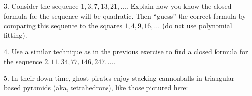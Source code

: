 \documentclass[10pt,]{book}
\theoremstyle{plain}
\theoremstyle{definition}
\numberwithin{equation}{chapter}
\newlength{\panelmax}
\begin{document}
\begin{exerciselist}
\par\smallskip
\item[3.]\hypertarget{exercise-164}{}
          Consider the sequence \(1, 3, 7, 13, 21, \ldots\). Explain how you know the closed formula for the sequence will be quadratic. Then ``guess'' the correct formula by comparing this sequence to the squares \(1, 4, 9, 16, \ldots\) (do not use polynomial fitting).
\par\smallskip
\item[4.]\hypertarget{exercise-165}{}
          Use a similar technique as in the previous exercise to find a closed formula for the sequence \(2, 11, 34, 77, 146, 247,\ldots\).
\par\smallskip
\item[5.]\hypertarget{exercise-166}{}
          In their down time, ghost pirates enjoy stacking cannonballs in triangular based pyramids (aka, tetrahedrons), like those pictured here:
{%
\setlength{\panelmax}{0pt}
\newsavebox{\panelboxNimage}
\newlength{\phNimage}\setlength{\phNimage}{\ht\panelboxNimage+\dp\panelboxNimage}
\settototalheight{\phNimage}{\usebox{\panelboxNimage}}
\setlength{\panelmax}{\maxof{\panelmax}{\phNimage}}
\newsavebox{\panelboxOimage}
\newlength{\phOimage}\setlength{\phOimage}{\ht\panelboxOimage+\dp\panelboxOimage}
\settototalheight{\phOimage}{\usebox{\panelboxOimage}}
\setlength{\panelmax}{\maxof{\panelmax}{\phOimage}}
\newsavebox{\panelboxPimage}
}
\end{exerciselist}
\end{document}

